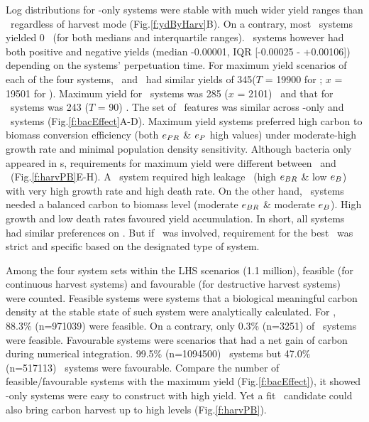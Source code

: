 \documentclass[../thesis.tex]{subfiles} %
\begin{document}
Log distributions for \phy-only systems were stable with much wider yield ranges than \pbs\ regardless of harvest mode (Fig.\ref{f:ydByHarv}B).  On a contrary, most \PBH\ systems yielded 0 \dxdt\ (for both medians and interquartile ranges).  \PBN\ systems however had both positive and negative yields (median -0.00001, IQR [-0.00025 - +0.00106]\dxdt) depending on the systems' perpetuation time.  For maximum yield scenarios of each of the four systems, \PoH\ and \PoN\ had similar yields of 345\dxdt ($T$ = 19900 for \PoN; $x$ = 19501 for \PoH).  Maximum yield for \PBH\ systems was 285 ($x$ = 2101) \dxdt\ and that for \PBN\ systems was 243 ($T$ = 90) \dxdt.  The set of \phy\ features was similar across \phy-only and \pbs\ systems (Fig.\ref{f:bacEffect}A-D).  Maximum yield systems preferred high carbon to biomass conversion efficiency (both $e_{PR}$ \& $e_P$ high values) under moderate-high growth rate and minimal population density sensitivity.  Although bacteria only appeared in \pbs s, requirements for maximum yield were different between \PBN\ and \PBH\ (Fig.\ref{f:harvPB}E-H).  A \PBN\ system required high leakage \bac\ (high $e_{BR}$ \& low $e_B$) with very high growth rate and high death rate.  On the other hand, \PBH\ systems needed a balanced carbon to biomass level (moderate $e_{BR}$ \& moderate $e_B$).  High growth and low death rates favoured yield accumulation.  In short, all systems had similar preferences on \phy.  But if \bac\ was involved, requirement for the best \bac\ was strict and specific based on the designated type of system.

Among the four system sets within the LHS scenarios (1.1 million), feasible (for continuous harvest systems) and favourable (for destructive harvest systems) were counted.  Feasible systems were systems that a biological meaningful carbon density at the stable state of such system were analytically calculated.  For \PoH, 88.3\% (n=971039) were feasible.  On a contrary, only 0.3\% (n=3251) of \PBH\ systems were feasible.  Favourable systems were scenarios that had a net gain of carbon during numerical integration.  99.5\% (n=1094500) \PoN\ systems but 47.0\% (n=517113) \PBN\ systems were favourable.  Compare the number of feasible/favourable systems with the maximum yield (Fig.\ref{f:bacEffect}), it showed \phy-only systems were easy to construct with high yield.  Yet a fit \bac\ candidate could also bring carbon harvest up to high levels (Fig.\ref{f:harvPB}).
\end{document}
